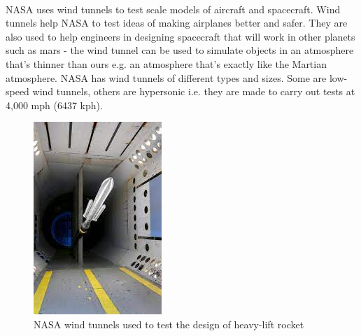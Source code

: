 \paragraph{}NASA uses wind tunnels to test scale models of aircraft and spacecraft. Wind tunnels help NASA to test ideas of making airplanes better and safer. They are also used to help engineers in designing spacecraft that will work in other planets such as mars - the wind tunnel can be used to simulate objects in an atmosphere that's thinner than ours e.g. an atmosphere that's exactly like the Martian atmosphere. NASA has wind tunnels of different types and sizes. Some are low-speed wind tunnels, others are hypersonic i.e. they are made to carry out tests at 4,000 mph (6437 kph).
\begin{center}
    \begin{figure}[!h]
\centering
\includegraphics{Figures/Fig4}
\caption{NASA wind tunnels used to test the design of heavy-lift rocket}
\end{figure}
\end{center}
